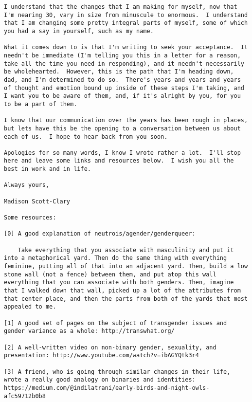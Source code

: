 \begin{paracol}{2}
\begin{leftcolumn}
\begin{verbatim}
I understand that the changes that I am making for myself, now that I'm nearing 30, vary in size from minuscule to enormous.  I understand that I am changing some pretty integral parts of myself, some of which you had a say in yourself, such as my name.

What it comes down to is that I'm writing to seek your acceptance.  It needn't be immediate (I'm telling you this in a letter for a reason, take all the time you need in responding), and it needn't necessarily be wholehearted.  However, this is the path that I'm heading down, dad, and I'm determined to do so.  There's years and years and years of thought and emotion bound up inside of these steps I'm taking, and I want you to be aware of them, and, if it's alright by you, for you to be a part of them.

I know that our communication over the years has been rough in places, but lets have this be the opening to a conversation between us about each of us.  I hope to hear back from you soon.

Apologies for so many words, I know I wrote rather a lot.  I'll stop here and leave some links and resources below.  I wish you all the best in work and in life.

Always yours,

Madison Scott-Clary

Some resources:

[0] A good explanation of neutrois/agender/genderqueer:

    Take everything that you associate with masculinity and put it into a metaphorical yard. Then do the same thing with everything feminine, putting all of that into an adjacent yard. Then, build a low stone wall (not a fence) between them, and put atop this wall everything that you can associate with both genders. Then, imagine that I walked down that wall, picked up a lot of the attributes from that center place, and then the parts from both of the yards that most appealed to me.

[1] A good set of pages on the subject of transgender issues and gender variance as a whole: http://transwhat.org/

[2] A well-written video on non-binary gender, sexuality, and presentation: http://www.youtube.com/watch?v=ibAGYQtk3r4

[3] A friend, who is going through similar changes in their life, wrote a really good analogy on binaries and identities: https://medium.com/@indilatrani/early-birds-and-night-owls-afc59712b0b8


\end{verbatim}
\end{leftcolumn}
\end{paracol}
